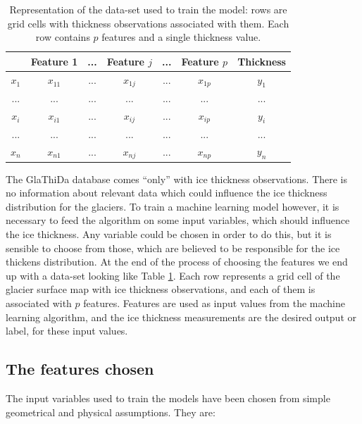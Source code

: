 \begin{table}[!bp]
	\centering
	\caption{Representation of the data-set used to train the model: rows are grid cells with thickness observations associated with them. Each row contains $p$ features and a single thickness value.}
	\label{tab:features}
	\begin{tabular}{|c|c|c|c|c|c|c|} 
		\cline{2-7}
		\multicolumn{1}{l|}{} & Feature 1 & ... & Feature $j$ & ... & Feature $p$ & Thickness \\  
		\hline
		$x_1$              & $x_{11}$ & ... & $x_{1j}$     & ... & $x_{1p}$     & $y_1$ \\   
		\hline
		...                   & ...       & ... & ...           & ... & ...           & ...    \\     
		\hline
		$x_i$              & $x_{i1}$ & ... & $x_{ij}$     & ... & $x_{ip}$     & $y_i$    \\
		\hline
		...                   & ...       & ... & ...           & ... & ...           & ...  \\       
		\hline
		$x_n$              & $x_{n1}$ & ... & $x_{nj}$     & ... & $x_{np}$     & $y_n$   \\      
		\hline
	\end{tabular}
\end{table}


The GlaThiDa database comes ``only'' with ice thickness observations. There is no information about relevant data which could influence the ice thickness distribution for the glaciers. To train a machine learning model however, it is necessary to feed the algorithm on some input variables, which should influence the ice thickness. Any variable could be chosen in order to do this, but it is sensible to choose from those, which are believed to be responsible for the ice thickens distribution. At the end of the process of choosing the features we end up with a data-set looking like Table \ref{tab:features}. Each row represents a grid cell of the glacier surface map with ice thickness observations, and each of them is associated with $p$ features. Features are used as input values from the machine learning algorithm, and the ice thickness measurements are the desired output or label, for these input values. 


\subsection{The features chosen}\label{features-chosen}
The input variables used to train the models have been chosen from simple geometrical and physical assumptions. They are:

